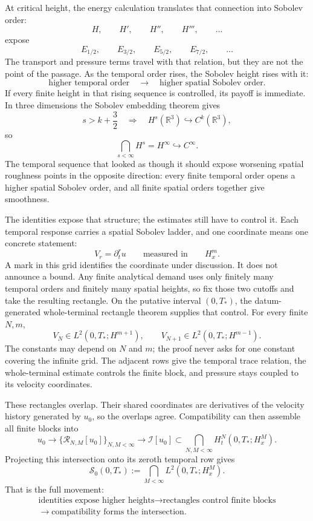 \documentclass[11pt]{article}
\begin{document}
At critical height, the energy calculation translates that connection into Sobolev order:
\[
H,\qquad H',\qquad H'',\qquad H''',\qquad\ldots
\]
expose
\[
E_{1/2},\qquad E_{3/2},\qquad E_{5/2},\qquad E_{7/2},\qquad\ldots
\]
The transport and pressure terms travel with that relation, but they are not the point of the passage.
As the temporal order rises, the Sobolev height rises with it:
\[
\text{higher temporal order}
\quad\longrightarrow\quad
\text{higher spatial Sobolev order}.
\]
If every finite height in that rising sequence is controlled, its payoff is immediate. In three dimensions the Sobolev embedding theorem gives
\[
s>k+\frac32
\quad\Longrightarrow\quad
H^s(\mathbb R^3)\hookrightarrow C^k(\mathbb R^3),
\]
so
\[
\bigcap_{s<\infty}H^s
=H^\infty
\hookrightarrow C^\infty.
\]
The temporal sequence that looked as though it should expose worsening spatial roughness points in the opposite direction: every finite temporal order opens a higher spatial Sobolev order, and all finite spatial orders together give smoothness.

The identities expose that structure; the estimates still have to control it. Each temporal response carries a spatial Sobolev ladder, and one coordinate means one concrete statement:
\[
V_r=\partial_t^ru
\qquad\text{measured in}\qquad
H_x^m.
\]
A mark in this grid identifies the coordinate under discussion. It does not announce a bound. Any finite analytical demand uses only finitely many temporal orders and finitely many spatial heights, so fix those two cutoffs and take the resulting rectangle. On the putative interval \((0,T_*)\), the datum-generated whole-terminal rectangle theorem supplies that control. For every finite \(N,m\),
\[
V_N\in L^2(0,T_*;H^{m+1}),
\qquad
V_{N+1}\in L^2(0,T_*;H^{m-1}).
\]
The constants may depend on \(N\) and \(m\); the proof never asks for one constant covering the infinite grid. The adjacent rows give the temporal trace relation, the whole-terminal estimate controls the finite block, and pressure stays coupled to its velocity coordinates.

These rectangles overlap. Their shared coordinates are derivatives of the velocity history generated by \(u_0\), so the overlaps agree. Compatibility can then assemble all finite blocks into
\[
u_0
\longrightarrow
\{\mathcal R_{N,M}[u_0]\}_{N,M<\infty}
\longrightarrow
\mathcal I[u_0]
\subset
\bigcap_{N,M<\infty}H_t^N(0,T_*;H_x^M).
\]
Projecting this intersection onto its zeroth temporal row gives
\[
\mathscr S_0(0,T_*)
:=
\bigcap_{M<\infty}L^2(0,T_*;H_x^M).
\]
That is the full movement:
\[
\begin{gathered}
\text{identities expose higher heights}
\longrightarrow
\text{rectangles control finite blocks} \\
\longrightarrow
\text{compatibility forms the intersection}.
\end{gathered}
\]
\end{document}
